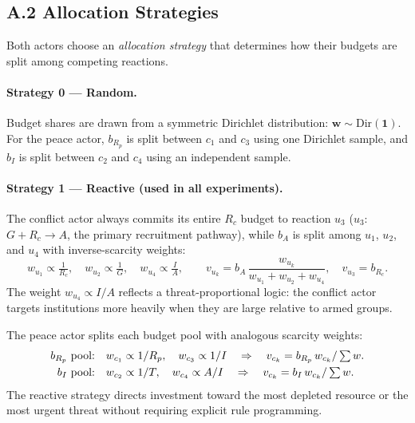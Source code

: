 \subsection*{A.2 Allocation Strategies}

Both actors choose an \emph{allocation strategy} that determines how their
budgets are split among competing reactions.

\paragraph{Strategy 0 — Random.}
Budget shares are drawn from a symmetric Dirichlet distribution:
$\mathbf{w} \sim \mathrm{Dir}(\mathbf{1})$.  For the peace actor,
$b_{R_p}$ is split between $c_1$ and $c_3$ using one Dirichlet sample, and
$b_I$ is split between $c_2$ and $c_4$ using an independent sample.

\paragraph{Strategy 1 — Reactive (used in all experiments).}
The conflict actor always commits its entire $R_c$ budget to reaction $u_3$
($u_3$: $G + R_c \to A$, the primary recruitment pathway), while $b_A$ is
split among $u_1$, $u_2$, and $u_4$ with inverse-scarcity weights:
\begin{equation}
    w_{u_1} \propto \tfrac{1}{R_c},\quad
    w_{u_2} \propto \tfrac{1}{G},\quad
    w_{u_4} \propto \tfrac{I}{A},
    \qquad
    v_{u_k} = b_A\,\frac{w_{u_k}}{w_{u_1}+w_{u_2}+w_{u_4}},
    \quad v_{u_3} = b_{R_c}.
\end{equation}
The weight $w_{u_4} \propto I/A$ reflects a threat-proportional logic: the
conflict actor targets institutions more heavily when they are large relative
to armed groups.

The peace actor splits each budget pool with analogous scarcity weights:
\begin{align}
    b_{R_p}\ \text{pool:}&\quad
        w_{c_1} \propto 1/R_p,\quad w_{c_3} \propto 1/I
        \quad\Rightarrow\quad v_{c_k} = b_{R_p}\,w_{c_k}/\textstyle\sum w. \notag\\
    b_I\ \text{pool:}&\quad
        w_{c_2} \propto 1/T,\quad w_{c_4} \propto A/I
        \quad\Rightarrow\quad v_{c_k} = b_I\,w_{c_k}/\textstyle\sum w. \notag
\end{align}
The reactive strategy directs investment toward the most depleted resource or
the most urgent threat without requiring explicit rule programming.

